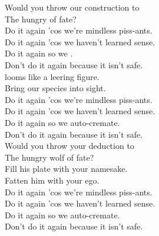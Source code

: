 



Would you throw our construction to \\
The hungry  of fate? \\

Do it again 'cos we're mindless piss-ants. \\
Do it again 'cos we haven't learned sense. \\
Do it again so we . \\
Don't do it again because it isn't safe. \\

 looms like a leering figure. \\
Bring our species into sight. \\

Do it again 'cos we're mindless piss-ants. \\
Do it again 'cos we haven't learned sense. \\
Do it again so we auto-cremate. \\
Don't do it again because it isn't safe. \\

Would you throw your deduction to \\
The hungry wolf of fate? \\
Fill his plate with your namesake. \\
Fatten him with your ego. \\

Do it again 'cos we're mindless piss-ants. \\
Do it again 'cos we haven't learned sense. \\
Do it again so we auto-cremate. \\
Don't do it again because it isn't safe. \\
